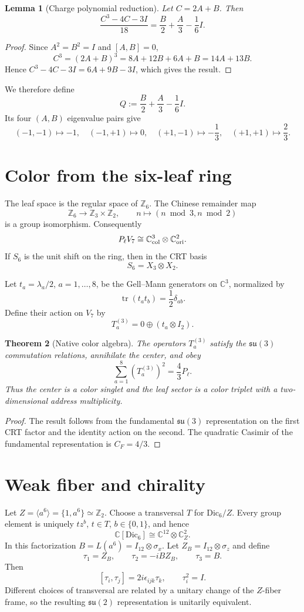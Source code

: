\documentclass[11pt]{article}
\newtheorem{theorem}{Theorem}[section]
\newtheorem{lemma}[theorem]{Lemma}
\theoremstyle{definition}\newtheorem{definition}[theorem]{Definition}
\theoremstyle{remark}\newtheorem{remark}[theorem]{Remark}
\begin{document}
\begin{lemma}[Charge polynomial reduction]
Let $C=2A+B$. Then
\[
\frac{C^3-4C-3I}{18}
=\frac{B}{2}+\frac{A}{3}-\frac16I.
\]
\end{lemma}
\begin{proof}
Since $A^2=B^2=I$ and $[A,B]=0$,
\[
C^3=(2A+B)^3=8A+12B+6A+B=14A+13B.
\]
Hence $C^3-4C-3I=6A+9B-3I$, which gives the result.
\end{proof}

We therefore define
\begin{equation}
\label{eq:Q}
Q:=\frac{B}{2}+\frac{A}{3}-\frac16I.
\end{equation}
Its four $(A,B)$ eigenvalue pairs give
\[
(-1,-1)\mapsto -1,
\quad(-1,+1)\mapsto0,
\quad(+1,-1)\mapsto-\frac13,
\quad(+1,+1)\mapsto\frac23.
\]

\section{Color from the six-leaf ring}
The leaf space is the regular space of $\mathbb Z_6$.  The Chinese remainder map
\[
\mathbb Z_6\longrightarrow\mathbb Z_3\times\mathbb Z_2,
\qquad n\longmapsto(n\bmod3,n\bmod2)
\]
is a group isomorphism. Consequently
\[
P_\ell V_7\cong\mathbb C^3_{\rm col}\otimes\mathbb C^2_{\rm ori}.
\]
If $S_6$ is the unit shift on the ring, then in the CRT basis
\[
S_6=X_3\otimes X_2.
\]

Let $t_a=\lambda_a/2$, $a=1,\ldots,8$, be the Gell--Mann generators on $\mathbb C^3$, normalized by
\[
\operatorname{tr}(t_at_b)=\frac12\delta_{ab}.
\]
Define their action on $V_7$ by
\[
T_a^{(3)}=0\oplus(t_a\otimes I_2).
\]

\begin{theorem}[Native color algebra]
The operators $T_a^{(3)}$ satisfy the $\mathfrak{su}(3)$ commutation relations, annihilate the center, and obey
\[
\sum_{a=1}^8\left(T_a^{(3)}\right)^2=\frac43P_\ell.
\]
Thus the center is a color singlet and the leaf sector is a color triplet with a two-dimensional address multiplicity.
\end{theorem}
\begin{proof}
The result follows from the fundamental $\mathfrak{su}(3)$ representation on the first CRT factor and the identity action on the second.  The quadratic Casimir of the fundamental representation is $C_F=4/3$.
\end{proof}

\section{Weak fiber and chirality}
Let $Z=\langle a^6\rangle=\{1,a^6\}\simeq\mathbb Z_2$.  Choose a transversal $T$ for $\mathrm{Dic}_6/Z$.  Every group element is uniquely $tz^b$, $t\in T$, $b\in\{0,1\}$, and hence
\[
\mathbb C[\mathrm{Dic}_6]\cong\mathbb C^{12}\otimes\mathbb C^2_Z.
\]
In this factorization $B=L(a^6)=I_{12}\otimes\sigma_x$.  Let $Z_B=I_{12}\otimes\sigma_z$ and define
\[
\tau_1=Z_B,\qquad
\tau_2=-iBZ_B,\qquad
\tau_3=B.
\]
Then
\[
[\tau_i,\tau_j]=2i\epsilon_{ijk}\tau_k,
\qquad \tau_i^2=I.
\]
Different choices of transversal are related by a unitary change of the $Z$-fiber frame, so the resulting $\mathfrak{su}(2)$ representation is unitarily equivalent.
\end{document}
